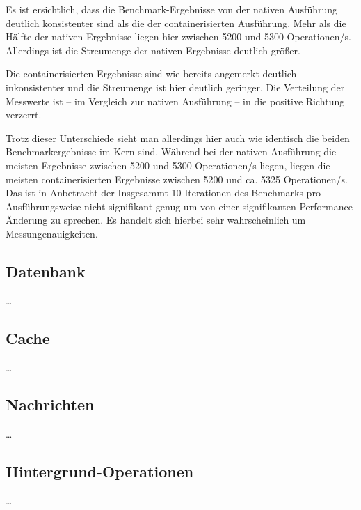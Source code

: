 \FloatBarrier

Es ist ersichtlich, dass die Benchmark-Ergebnisse von der nativen Ausführung deutlich konsistenter sind als die der containerisierten Ausführung. Mehr als die Hälfte der nativen Ergebnisse liegen hier zwischen 5200 und 5300 Operationen/s. Allerdings ist die Streumenge der nativen Ergebnisse deutlich größer. 

Die containerisierten Ergebnisse sind wie bereits angemerkt deutlich inkonsistenter und die Streumenge ist hier deutlich geringer. Die Verteilung der Messwerte ist – im Vergleich zur nativen Ausführung – in die positive Richtung verzerrt.  

Trotz dieser Unterschiede sieht man allerdings hier auch wie identisch die beiden Benchmarkergebnisse im Kern sind. Während bei der nativen Ausführung die meisten Ergebnisse zwischen 5200 und 5300 Operationen/s liegen, liegen die meisten containerisierten Ergebnisse zwischen 5200 und ca. 5325 Operationen/s. Das ist in Anbetracht der Insgesammt 10 Iterationen des Benchmarks pro Ausführungsweise nicht signifikant genug um von einer signifikanten Performance-Änderung zu sprechen. Es handelt sich hierbei sehr wahrscheinlich um Messungenauigkeiten. 


\subsection{Datenbank}

\dots


\subsection{Cache}

\dots

\subsection{Nachrichten}

\dots



\subsection{Hintergrund-Operationen}

\dots

